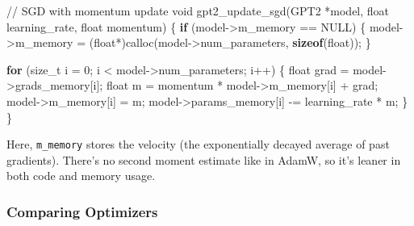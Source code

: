 \documentclass[
  letterpaper,
  DIV=11,
  numbers=noendperiod]{scrreprt}
\newenvironment{Shaded}{\begin{snugshade}}{\end{snugshade}}
\newcommand{\CommentTok}[1]{\textcolor[rgb]{0.37,0.37,0.37}{#1}}
\newcommand{\ControlFlowTok}[1]{\textcolor[rgb]{0.00,0.23,0.31}{\textbf{#1}}}
\newcommand{\DataTypeTok}[1]{\textcolor[rgb]{0.68,0.00,0.00}{#1}}
\newcommand{\DecValTok}[1]{\textcolor[rgb]{0.68,0.00,0.00}{#1}}
\newcommand{\KeywordTok}[1]{\textcolor[rgb]{0.00,0.23,0.31}{\textbf{#1}}}
\newcommand{\NormalTok}[1]{\textcolor[rgb]{0.00,0.23,0.31}{#1}}
\newcommand{\OperatorTok}[1]{\textcolor[rgb]{0.37,0.37,0.37}{#1}}
\begin{document}
\begin{Shaded}
\begin{Highlighting}[]
\CommentTok{// SGD with momentum update}
\DataTypeTok{void}\NormalTok{ gpt2\_update\_sgd}\OperatorTok{(}\NormalTok{GPT2 }\OperatorTok{*}\NormalTok{model}\OperatorTok{,} \DataTypeTok{float}\NormalTok{ learning\_rate}\OperatorTok{,} \DataTypeTok{float}\NormalTok{ momentum}\OperatorTok{)} \OperatorTok{\{}
    \ControlFlowTok{if} \OperatorTok{(}\NormalTok{model}\OperatorTok{{-}\textgreater{}}\NormalTok{m\_memory }\OperatorTok{==}\NormalTok{ NULL}\OperatorTok{)} \OperatorTok{\{}
\NormalTok{        model}\OperatorTok{{-}\textgreater{}}\NormalTok{m\_memory }\OperatorTok{=} \OperatorTok{(}\DataTypeTok{float}\OperatorTok{*)}\NormalTok{calloc}\OperatorTok{(}\NormalTok{model}\OperatorTok{{-}\textgreater{}}\NormalTok{num\_parameters}\OperatorTok{,} \KeywordTok{sizeof}\OperatorTok{(}\DataTypeTok{float}\OperatorTok{));}
    \OperatorTok{\}}

    \ControlFlowTok{for} \OperatorTok{(}\DataTypeTok{size\_t}\NormalTok{ i }\OperatorTok{=} \DecValTok{0}\OperatorTok{;}\NormalTok{ i }\OperatorTok{\textless{}}\NormalTok{ model}\OperatorTok{{-}\textgreater{}}\NormalTok{num\_parameters}\OperatorTok{;}\NormalTok{ i}\OperatorTok{++)} \OperatorTok{\{}
        \DataTypeTok{float}\NormalTok{ grad }\OperatorTok{=}\NormalTok{ model}\OperatorTok{{-}\textgreater{}}\NormalTok{grads\_memory}\OperatorTok{[}\NormalTok{i}\OperatorTok{];}
        \DataTypeTok{float}\NormalTok{ m }\OperatorTok{=}\NormalTok{ momentum }\OperatorTok{*}\NormalTok{ model}\OperatorTok{{-}\textgreater{}}\NormalTok{m\_memory}\OperatorTok{[}\NormalTok{i}\OperatorTok{]} \OperatorTok{+}\NormalTok{ grad}\OperatorTok{;}
\NormalTok{        model}\OperatorTok{{-}\textgreater{}}\NormalTok{m\_memory}\OperatorTok{[}\NormalTok{i}\OperatorTok{]} \OperatorTok{=}\NormalTok{ m}\OperatorTok{;}
\NormalTok{        model}\OperatorTok{{-}\textgreater{}}\NormalTok{params\_memory}\OperatorTok{[}\NormalTok{i}\OperatorTok{]} \OperatorTok{{-}=}\NormalTok{ learning\_rate }\OperatorTok{*}\NormalTok{ m}\OperatorTok{;}
    \OperatorTok{\}}
\OperatorTok{\}}
\end{Highlighting}
\end{Shaded}

Here, \texttt{m\_memory} stores the velocity (the exponentially decayed
average of past gradients). There's no second moment estimate like in
AdamW, so it's leaner in both code and memory usage.

\subsubsection{Comparing Optimizers}\label{comparing-optimizers}
\end{document}
